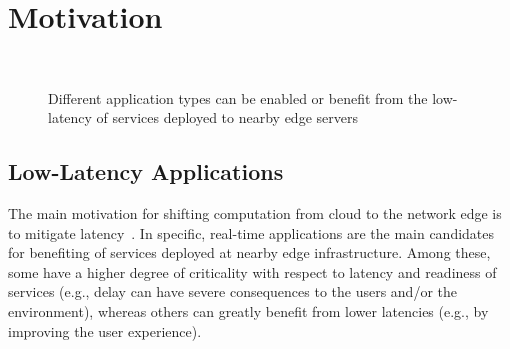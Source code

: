 \section{Motivation}\label{sec:motivation}

\begin{figure}[tbp]
	\centering
	\hfill
	~
	\hfill
	\caption{Different application types can be enabled or benefit from the low-latency of services deployed to nearby edge servers} \label{fig:motivational-cases}
\end{figure}

\subsection{Low-Latency Applications}

The main motivation for shifting computation from cloud to the network edge is to mitigate latency~\cite{Bonomi2014}. In specific, real-time applications are the main candidates for benefiting of services deployed at nearby edge infrastructure. Among these, some have a higher degree of criticality with respect to latency and readiness of services (e.g., delay can have severe consequences to the users and/or the environment), whereas others can greatly benefit from lower latencies (e.g., by improving the user experience).

